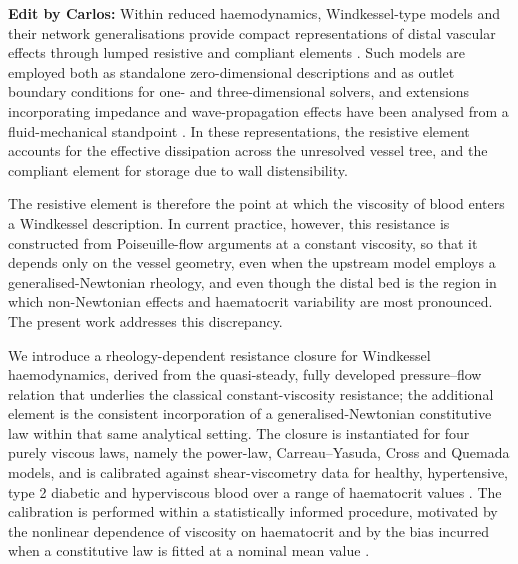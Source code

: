 \documentclass[lineno]{jfm}
\newcommand{\cbp}[1]{{\color{blue} \textbf{Edit by Carlos:} #1}}
\begin{document}
\cbp{Within reduced haemodynamics, Windkessel-type models and their network generalisations provide compact representations of distal vascular effects through lumped resistive and compliant elements \citep{frank1990basic,westerhof2009arterial}. Such models are employed both as standalone zero-dimensional descriptions and as outlet boundary conditions for one- and three-dimensional solvers, and extensions incorporating impedance and wave-propagation effects have been analysed from a fluid-mechanical standpoint \citep{bessems2007wave,mei2018fluid,westerhof2009arterial}. In these representations, the resistive element accounts for the effective dissipation across the unresolved vessel tree, and the compliant element for storage due to wall distensibility.

The resistive element is therefore the point at which the viscosity of blood enters a Windkessel description. In current practice, however, this resistance is constructed from Poiseuille-flow arguments at a constant viscosity, so that it depends only on the vessel geometry, even when the upstream model employs a generalised-Newtonian rheology, and even though the distal bed is the region in which non-Newtonian effects and haematocrit variability are most pronounced. The present work addresses this discrepancy.

We introduce a rheology-dependent resistance closure for Windkessel haemodynamics, derived from the quasi-steady, fully developed pressure–flow relation that underlies the classical constant-viscosity resistance; the additional element is the consistent incorporation of a generalised-Newtonian constitutive law within that same analytical setting. The closure is instantiated for four purely viscous laws, namely the power-law, Carreau–Yasuda, Cross and Quemada models, and is calibrated against shear-viscometry data for healthy, hypertensive, type 2 diabetic and hyperviscous blood over a range of haematocrit values \citep{Quemada1977,Popel2005,cho2008hemorheological,Sun2022}. The calibration is performed within a statistically informed procedure, motivated by the nonlinear dependence of viscosity on haematocrit and by the bias incurred when a constitutive law is fitted at a nominal mean value \citep{Chien1987,cho2008hemorheological,Westgard2024}.
}
\end{document}
